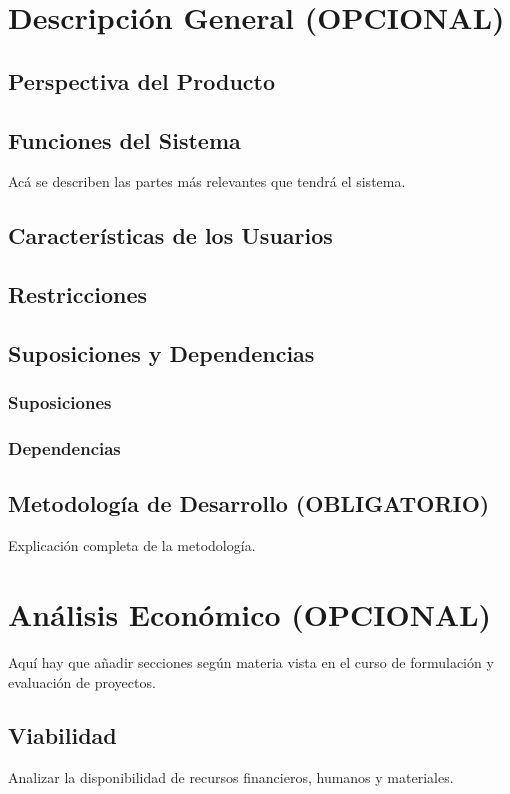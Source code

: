 \documentclass[letter,12pt]{report}
\newcommand\rojo[1]{\textcolor[rgb]{1,0,0}{#1}}
\begin{document}
\chapter{Descripción General (\rojo{OPCIONAL})}\label{descripcion}
\section{Perspectiva del Producto}
\section{Funciones del Sistema}
Acá se describen las partes más relevantes que tendrá el sistema.
\section{Características de los Usuarios}
\section{Restricciones}
\section{Suposiciones y Dependencias}
\subsection{Suposiciones}
\subsection{Dependencias}
\section{Metodología de Desarrollo (\rojo{OBLIGATORIO})}
Explicación completa de la metodología.

\chapter{Análisis Económico (\rojo{OPCIONAL})}\label{economico}

Aquí hay que añadir secciones según materia vista en el curso de formulación y evaluación de proyectos.

\section{Viabilidad}
Analizar la disponibilidad de recursos financieros, humanos y materiales.
\end{document}
